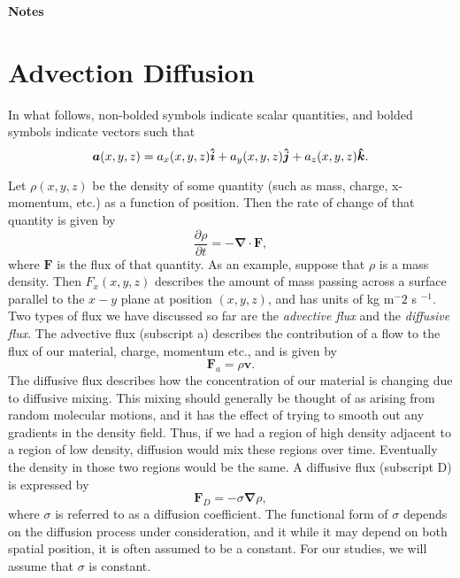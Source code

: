 \documentclass[12pt]{article}
\newcommand{\del}{\mbox{\boldmath $\nabla$}}
\def\del{\nabla}
\def\vec{\boldsymbol}
\newcommand{\uvk}{\mbox{\boldmath $\hat{k}$}}
\newcommand{\uvi}{\mbox{\boldmath $\hat{i}$}}
\newcommand{\uvj}{\mbox{\boldmath $\hat{j}$}}
\begin{document}
\thispagestyle{empty}
\noindent
{\bf Notes}




\section{Advection Diffusion}
In what follows, non-bolded symbols indicate scalar quantities, and bolded symbols indicate vectors such that
\begin{equation}
\vec{a}(x,y,z) = a_x(x,y,z) \uvi + a_y(x,y,z) \uvj + a_z(x,y,z) \uvk .
\end{equation}

Let $\rho(x,y,z)$ be the density of some quantity (such as mass, charge, x-momentum, etc.) as a function of position.  Then the rate of change of that quantity is given by
\begin{equation}
\frac{\partial\rho}{\partial t} = -\vec{\del}\cdot\vec{F} ,
\end{equation}
where $\vec{F}$ is the flux of that quantity.  As an example, suppose that $\rho$ is a mass density.  Then $F_x(x,y,z)$ describes the amount of mass passing across a surface parallel to the $x-y$ plane at position $(x,y,z)$, and has units of kg m$^-2$ s $^{-1}$.  Two types of flux we have discussed so far are the \textit{advective flux} and the \textit{diffusive flux}.  The advective flux (subscript a) describes the contribution of a flow to the flux of our material, charge, momentum etc., and is given by
\begin{equation}
\vec{F}_a = \rho \vec{v} .
\end{equation}
The diffusive flux describes how the concentration of our material is changing due to diffusive mixing.  This mixing should generally be thought of as arising from random molecular motions, and it has the effect of trying to smooth out any gradients in the density field.  Thus, if we had a region of high density adjacent to a region of low density, diffusion would mix these regions over time.  Eventually the density in those two regions would be the same.  A diffusive flux (subscript D) is expressed by
\begin{equation}
\vec{F}_D = -\sigma \vec{\del}\rho ,
\end{equation}
where $\sigma$ is referred to as a diffusion coefficient.  The functional form of $\sigma$ depends on the diffusion process under consideration, and it while it may depend on both spatial position, it is often assumed to be a constant.  For our studies, we will assume that $\sigma$ is constant.
\end{document}

